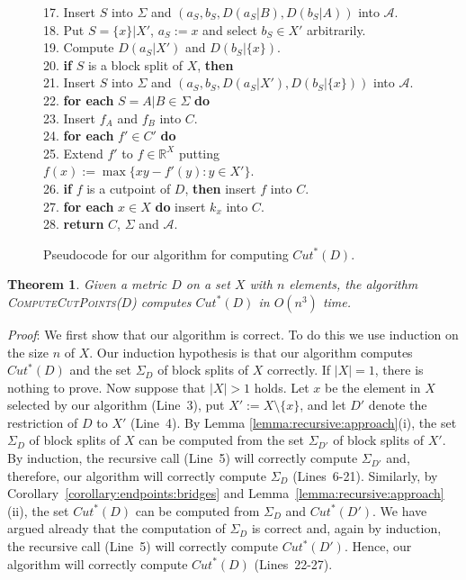 \documentclass[12pt]{article}
\newtheorem{theorem}[prop]{Theorem}
\begin{document}
\begin{figure}
\begin{tabbing}
17. \> \> \> Insert \(S\) into \(\Sigma\) and \((a_S,b_S,D(a_S|B),D(b_S|A))\) into \(\mathcal{A}\).\\
18. \> Put \(S = \{x\}|X'\), \(a_S := x\) and select \(b_S \in X'\) arbitrarily.\\
19. \> Compute \(D(a_S|X')\) and \(D(b_S|\{x\})\).\\
20. \> \textbf{if} \(S\) is a block split of \(X\), \textbf{then}\\
21. \> \> Insert \(S\) into \(\Sigma\) and \((a_S,b_S,D(a_S|X'),D(b_S|\{x\}))\) into \(\mathcal{A}\).\\ 
22. \> \textbf{for each} \(S = A|B \in \Sigma\) \textbf{do}\\
23. \> \> Insert \(f_A\) and \(f_B\) into \(C\).\\
24. \> \textbf{for each} \(f' \in C'\) \textbf{do}\\
25. \> \> Extend \(f'\) to \(f \in \mathbb{R}^X\) putting \(f(x) := \max\{xy-f'(y) : y \in X'\}\).\\
26. \> \> \textbf{if} \(f\) is a cutpoint of \(D\), 
         \textbf{then} insert \(f\) into \(C\).\\
27. \> \textbf{for each} \(x \in X\) \textbf{do} insert \(k_x\) into \(C\).\\
28. \> \textbf{return} \(C\), \(\Sigma\) and \(\mathcal{A}\).
\end{tabbing}
\caption{Pseudocode for our algorithm for computing \(Cut^*(D)\).}
\label{algorithm:cut:points}
\end{figure}


\begin{theorem}
\label{theorem:algorithm:cut:points}
Given a metric \(D\) on a set \(X\) with \(n\) elements, the
algorithm \textsc{ComputeCutPoints}(\(D\)) computes \(Cut^*(D)\)
in \(O(n^3)\) time.
\end{theorem}

\noindent\textsl{Proof}:
We first show that our algorithm is correct. To do this we use induction
on the size \(n\) of \(X\). Our induction hypothesis is that our
algorithm computes \(Cut^*(D)\) and the set \(\Sigma_D\) of block splits of \(X\) correctly.
If \(|X| = 1\), there is nothing to prove.
Now suppose that \(|X| > 1\) holds. 
Let \(x\) be the element in \(X\) selected by our algorithm (Line~3), 
put \(X' := X \setminus \{x\}\), and let \(D'\) denote
the restriction of \(D\) to \(X'\) (Line~4).
By Lemma \ref{lemma:recursive:approach}(i), the set \(\Sigma_D\) of block splits of \(X\)
can be computed from the set \(\Sigma_{D'}\) of block splits of \(X'\).
By induction, the recursive call (Line~5) will correctly compute \(\Sigma_{D'}\) and,
therefore, our algorithm will correctly compute \(\Sigma_D\) (Lines~6-21).
Similarly, by Corollary~\ref{corollary:endpoints:bridges}
and Lemma~\ref{lemma:recursive:approach}(ii), the set \(Cut^*(D)\) can be computed
from \(\Sigma_D\) and \(Cut^*(D')\). We have argued already that the computation
of \(\Sigma_D\) is correct and, again by induction, the recursive call (Line~5) 
will correctly compute \(Cut^*(D')\). Hence, our algorithm will correctly 
compute \(Cut^*(D)\) (Lines~22-27). 
\end{document}
